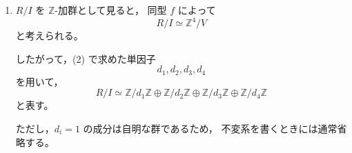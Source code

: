 \begin{strategy}
\begin{enumerate}
		\item[(3)]
		\(R/I\) を \(\mathbb{Z}\)-加群として見ると，
		同型 \(f\) によって
		\[
		R/I\simeq \mathbb{Z}^4/V
		\]
		と考えられる。
		
		したがって，(2) で求めた単因子
		\[
		d_1,d_2,d_3,d_4
		\]
		を用いて，
		\[
		R/I
		\simeq
		\mathbb{Z}/d_1\mathbb{Z}
		\oplus
		\mathbb{Z}/d_2\mathbb{Z}
		\oplus
		\mathbb{Z}/d_3\mathbb{Z}
		\oplus
		\mathbb{Z}/d_4\mathbb{Z}
		\]
		と表す。
		
		ただし，\(d_i=1\) の成分は自明な群であるため，
		不変系を書くときには通常省略する。
	\end{enumerate}
\end{strategy}